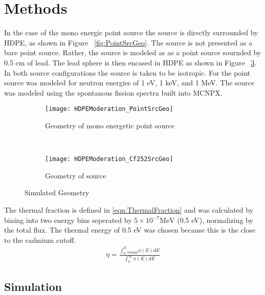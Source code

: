 \section{Methods}

In the case of the mono energic point source the source is directly surrounded by HDPE, as shown in Figure ~\ref{fig:PointSrcGeo}. 
The  source is not presented as a bare point source.
Rather, the source is modeled as as a point  source sournded by 0.5 cm of lead. The lead sphere is then encased in HDPE as shown in Figure ~\ref{fig:Cf252SrcGeo}.
In both source configurations the source is taken to be isotropic. 
For the point source was modeled for neutron energies of 1 eV, 1 keV, and 1 MeV.
The  source was modeled using the spontanous fission spectra built into MCNPX.
\begin{figure}
  \centering
  \begin{subfigure}[b]{0.45\textwidth}
    \centering
    \texttt{[image: HDPEModeration\_PointSrcGeo]}
    \caption{Geometry of mono energetic point source}
    \label{fig:Cf252SrcGeo}
  \end{subfigure}%
  ~
  \begin{subfigure}[b]{0.45\textwidth}
    \centering
    \texttt{[image: HDPEModeration\_Cf252SrcGeo]}
    \caption{Geometry of  source}
    \label{fig:Cf252SrcGeo}
  \end{subfigure}
  \caption{Simulated Geometry}
\end{figure}

The thermal fraction is defined in \eqref{eqn:ThermalFraction} and was calculated by bining into two energy bins seperated by $5\times10^{-7}\text{MeV}$ (0.5 eV), normalizing by the total flux.
The thermal energy of 0.5 eV was chosen because this is the close to the cadmium cutoff.
\begin{align}
    \label{eqn:ThermalFraction}
    \eta = \frac{\int_0^E_\text{termal} \phi(E)dE}{\int_0^\infty \phi(E)dE}
\end{align}

\subsection{Simulation}
%
